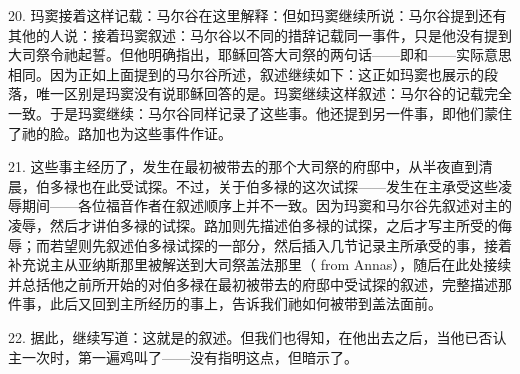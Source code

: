 20. 玛窦接着这样记载：马尔谷在这里解释：但如玛窦继续所说：马尔谷提到还有其他的人说：接着玛窦叙述：马尔谷以不同的措辞记载同一事件，只是他没有提到大司祭令祂起誓。但他明确指出，耶稣回答大司祭的两句话——即和——实际意思相同。因为正如上面提到的马尔谷所述，叙述继续如下：这正如玛窦也展示的段落，唯一区别是玛窦没有说耶稣回答的是。玛窦继续这样叙述：马尔谷的记载完全一致。于是玛窦继续：马尔谷同样记录了这些事。他还提到另一件事，即他们蒙住了祂的脸。路加也为这些事件作证。\par

21. 这些事主经历了，发生在最初被带去的那个大司祭的府邸中，从半夜直到清晨，伯多禄也在此受试探。不过，关于伯多禄的这次试探——发生在主承受这些凌辱期间——各位福音作者在叙述顺序上并不一致。因为玛窦和马尔谷先叙述对主的凌辱，然后才讲伯多禄的试探。路加则先描述伯多禄的试探，之后才写主所受的侮辱；而若望则先叙述伯多禄试探的一部分，然后插入几节记录主所承受的事，接着补充说主从亚纳斯那里被解送到大司祭盖法那里（ from Annas），随后在此处接续并总括他之前所开始的对伯多禄在最初被带去的府邸中受试探的叙述，完整描述那件事，此后又回到主所经历的事上，告诉我们祂如何被带到盖法面前。\par

22. 据此，继续写道：这就是的叙述。但我们也得知，在他出去之后，当他已否认主一次时，第一遍鸡叫了——没有指明这点，但暗示了。\par

